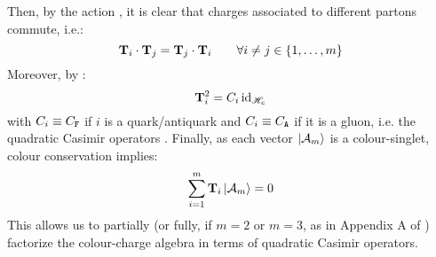 Then, by the action , it is clear that charges associated to different partons commute, i.e.:
\begin{equation}
  \mathbf{T}_i \cdot \mathbf{T}_j = \mathbf{T}_j \cdot \mathbf{T}_i
  \qquad
  \forall i \neq j \in \{1, \dots, m\}
\end{equation}
Moreover, by :
\begin{equation}
  \mathbf{T}_i^2 = C_i \operatorname{id}_{\mathscr{H}_c}
\end{equation}
with $ C_i \equiv C_\mathtt{F} $ if $ i $ is a quark/antiquark and $ C_i \equiv C_\mathtt{A} $ if it is a gluon, i.e. the quadratic Casimir operators . Finally, as each vector $ \ket{\mathcal{A}_m} $ is a colour-singlet, colour conservation implies:
\begin{equation}
  \sum_{i = 1}^{m} \mathbf{T}_i \ket{\mathcal{A}_m} = 0
\end{equation}
This allows us to partially (or fully, if $ m = 2 $ or $ m = 3 $, as in Appendix A of \cite{Catani-1997}) factorize the colour-charge algebra in terms of quadratic Casimir operators.










